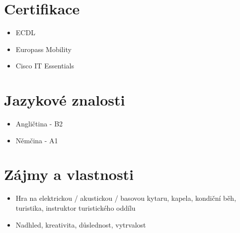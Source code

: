 \documentclass[12pt,a4paper]{article}
\begin{document}
\section*{Certifikace}

\begin{itemize}
  \item ECDL
  \item Europass Mobility
  \item Cisco IT Essentials
\end{itemize}

\section*{Jazykové znalosti}

\begin{itemize}
  \item Angličtina - B2
  \item Němčina - A1
\end{itemize}

\section*{Zájmy a vlastnosti}

\begin{itemize}
  \item Hra na elektrickou / akustickou / basovou kytaru, kapela, kondiční běh,
        turistika, instruktor turistického oddílu
  \item Nadhled, kreativita, důslednost, vytrvalost
\end{itemize}
\end{document}
